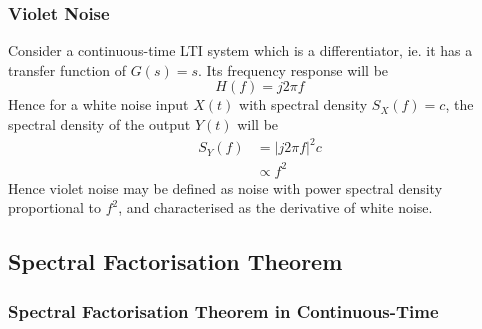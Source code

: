 \documentclass[11pt]{report} %
\begin{document}
\subsubsection{Violet Noise}

Consider a continuous-time LTI system which is a differentiator, ie. it has a transfer function of $G\left(s\right) = s$. Its frequency response will be
\begin{equation}
H\left(f\right) = j2\pi f
\end{equation}
Hence for a white noise input $X\left(t\right)$ with spectral density $S_{X}\left(f\right) = c$, the spectral density of the output $Y\left(t\right)$ will be
\begin{align}
S_{Y}\left(f\right) &= \left|j2\pi f\right|^{2}c \\
&\propto f^{2}
\end{align}
Hence violet noise may be defined as noise with power spectral density proportional to $f^{2}$, and characterised as the derivative of white noise.

\subsection{Spectral Factorisation Theorem \cite{Astrom1970}}

\subsubsection{Spectral Factorisation Theorem in Continuous-Time}
\end{document}
